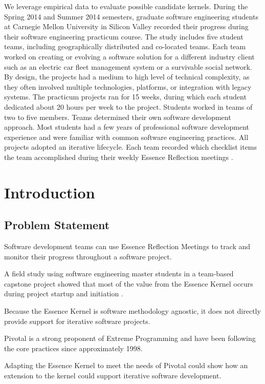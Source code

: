\documentclass[preprint,12pt,3p]{elsarticle}
\begin{document}
We leverage empirical data to evaluate possible candidate kernels. During the Spring 2014 and Summer 2014 semesters, graduate software engineering students at Carnegie Mellon University in Silicon Valley recorded their progress during their software engineering practicum course. The study includes five student teams, including geographically distributed and co-located
teams. Each team worked on creating or evolving a software solution for a different industry client such as an electric car fleet management system or a survivable social network. By design, the projects had a medium to high level of technical complexity, as they often involved multiple technologies, platforms, or integration with legacy systems. The practicum
projects ran for 15 weeks, during which each student dedicated about 20 hours per week to the project. Students worked in teams of two to five members. Teams determined their own software development approach. Most students had a few years of professional software development experience and were familiar with common software engineering practices. All projects adopted an iterative lifecycle. Each team recorded which checklist items the team accomplished during their weekly Essence Reflection meetings \cite{EASE2014}.

\section{Introduction}

\subsection{Problem Statement}
Software development teams can use Essence Reflection Meetings \cite{EASE2014} to track and monitor their progress throughout a software project. 

A field study using software engineering master students in a team-based capstone project showed that most of the value from the Essence Kernel occurs during project startup and initiation \cite{ICSE2014}.

Because the Essence Kernel is software methodology agnostic, it does not directly provide support for iterative software projects. \cite{ICSE2014}

Pivotal is a strong proponent of Extreme Programming and have been following the core practices since approximately 1998.

Adapting the Essence Kernel to meet the needs of Pivotal could show how an extension to the kernel could support iterative software development.
\end{document}
